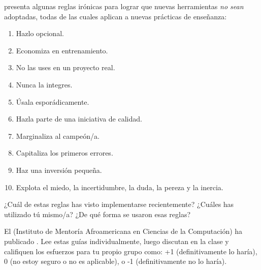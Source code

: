 \cite{Farm2006} presenta algunas reglas irónicas para lograr que nuevas herramientas \emph{no sean} adoptadas,
todas de las cuales aplican a nuevas prácticas de enseñanza:

\begin{enumerate}

\item
  Hazlo opcional.

\item
Economiza en entrenamiento. 

\item
  No las uses en un proyecto real.

\item
  Nunca la integres.

\item
Úsala esporádicamente.

\item
  Hazla parte de una iniciativa de calidad.

\item
  Marginaliza al campeón/a.

\item
Capitaliza los primeros errores.

\item
Haz una inversión pequeña.

\item
 Explota el miedo, la incertidumbre, la duda, la pereza y la inercia.

\end{enumerate}
¿Cuál de estas reglas has visto implementarse recientemente?
¿Cuáles has utilizado tú mismo/a?
¿De qué forma se usaron esas reglas?


El  
(Instituto de Mentoría Afroamericana en Ciencias de la Computación)
ha publicado .
Lee estas guías individualmente,
luego discutan en la clase
y califiquen los esfuerzos para tu propio grupo como: +1 (definitivamente lo haría),
0 (no estoy seguro o no es aplicable),
o -1 (definitivamente no lo haría).
